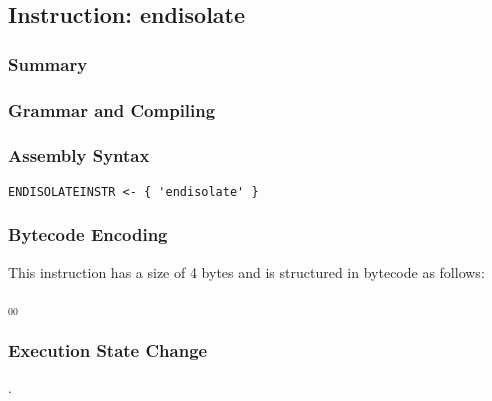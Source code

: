 \subsection{Instruction: endisolate}

\subsubsection{Summary}


\subsubsection{Grammar and Compiling}


\subsubsection{Assembly Syntax}

\begin{myquote}
\begin{verbatim}
ENDISOLATEINSTR <- { 'endisolate' }
\end{verbatim}
\end{myquote}

\subsubsection{Bytecode Encoding}

This instruction has a size of 4 bytes and is structured in bytecode as follows:

$_{00}$\ 


\subsubsection{Execution State Change}

.


